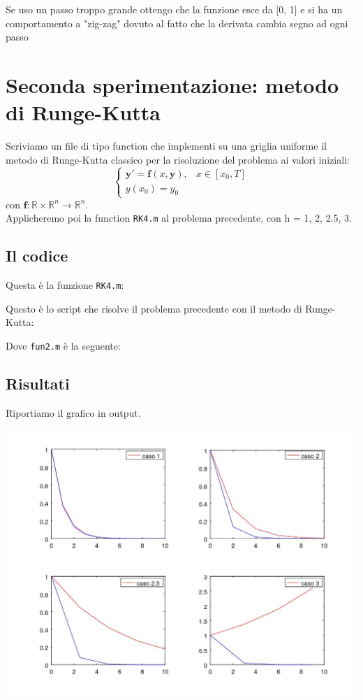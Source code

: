 \documentclass{article}
\begin{document}
	Se uso un passo troppo grande ottengo che la funzione esce da [0, 1] e si ha un comportamento a "zig-zag" dovuto al fatto che la derivata cambia segno ad ogni passo
	
	\section{Seconda sperimentazione: metodo di Runge-Kutta}
	Scriviamo un file di tipo function che implementi su una griglia uniforme il metodo di Runge-Kutta classico per la risoluzione del problema ai valori iniziali:
	\begin{equation}
	\begin{cases}
	\bm{y'}=\bm{f}(x,\bm{y}), & x \in\left[x_0, T\right] \\
	y(x_0)=y_0
	\end{cases}
	\end{equation}
	con $\bm{f} : \mathbb{R} \times \mathbb{R}^n \rightarrow \mathbb{R}^n$. \\
	Applicheremo poi la function { \tt RK4.m} al problema precedente, con h = 1, 2, 2.5, 3.

	\subsection{Il codice}
	Questa è la funzione {\tt RK4.m}:
	
	
	
	Questo è lo script che risolve il problema precedente con il metodo di Runge-Kutta:
	
	
	
	Dove {\tt fun2.m} è la seguente:
	
	
	\subsection{Risultati}
	
	Riportiamo il grafico in output.
	
	\includegraphics[width=\textwidth]{2_2_confronto_h_RK.jpeg}
	
\end{document}
